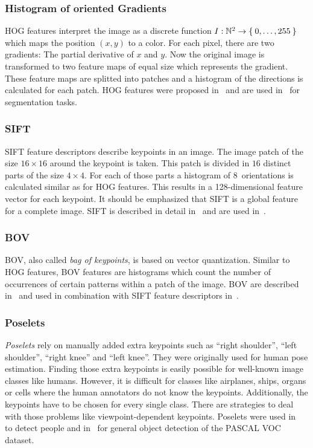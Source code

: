 \documentclass[technote,a4paper,leqno]{IEEEtran}
\begin{document}
\subsubsection{Histogram of oriented Gradients}
\Gls{HOG} features interpret the image as a discrete function
$I: \mathbb{N}^2 \rightarrow \Set{0, \dots, 255}$ which maps the position $(x,
y)$ to a color. For each pixel, there are two gradients: The partial derivative
of $x$ and $y$. Now the original image is transformed to two feature maps of
equal size which represents the gradient. These feature maps are splitted into
patches and a histogram of the directions is calculated for each patch.
\gls{HOG} features were proposed in~\cite{1467360} and are used
in~\cite{bourdev2010detecting,felzenszwalb2010object} for segmentation tasks.
\subsubsection{SIFT}
\Gls{SIFT} feature descriptors describe keypoints in an image. The image patch
of the size $16 \times 16$ around the keypoint is taken. This patch is divided
in $16$ distinct parts of the size $4 \times 4$. For each of those parts a
histogram of 8~orientations is calculated similar as for \gls{HOG} features.
This results in a 128-dimensional feature vector for each keypoint.
It should be emphasized that SIFT is a global feature for a complete image.
\Gls{SIFT} is described in detail in~\cite{raey} and are used in~\cite{plath2009multi}.
\subsubsection{BOV}
\Gls{BOV}, also called \textit{bag of keypoints}, is based on vector
quantization. Similar to \gls{HOG} features, \gls{BOV} features are histograms
which count the number of occurrences of certain patterns within a patch of the
image. \Gls{BOV} are described in~\cite{csurka2004visual} and used in
combination with \gls{SIFT} feature descriptors in~\cite{csurka2008simple}.
\subsubsection{Poselets}
\textit{Poselets} rely on manually added extra keypoints such as \enquote{right
shoulder}, \enquote{left shoulder}, \enquote{right knee} and \enquote{left
knee}. They were originally used for human pose estimation. Finding those extra
keypoints is easily possible for well-known image classes like humans. However,
it is difficult for classes like airplanes, ships, organs or cells where the
human annotators do not know the keypoints. Additionally, the keypoints have to
be chosen for every single class. There are strategies to deal with those
problems like viewpoint-dependent keypoints. Poselets were used
in~\cite{bourdev2010detecting} to detect people and in~\cite{brox2011object}
for general object detection of the PASCAL VOC dataset.
\end{document}
